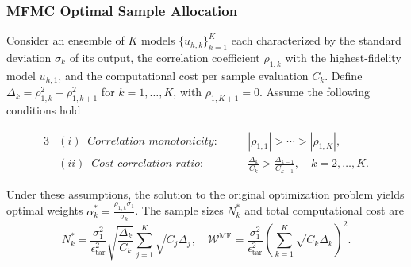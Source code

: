 \documentclass{beamer}
\begin{document}
\begin{frame}[t]
    \frametitle{MFMC Optimal Sample Allocation}
        {\fontsize{8}{8}\selectfont 
        \begin{theorem}
        \label{thm:Sample_size_est}
        Consider an ensemble of $K$ models $\{u_{h,k}\}_{k=1}^K$ each characterized by the standard deviation $\sigma_k$ of its output, the correlation coefficient $\rho_{1,k}$ with the highest-fidelity model $u_{h,1}$, and the computational cost per sample evaluation $C_k$. Define $\Delta_k = \rho_{1,k}^2 - \rho_{1,k+1}^2$ for $k = 1, \dots, K$, with $\rho_{1,K+1} = 0$. Assume the following conditions hold
        \vspace{-5mm}
        
        \begin{alignat*}{3}
        &(i)\;\; \textit{Correlation monotonicity}: \quad && |\rho_{1,1}| > \cdots > |\rho_{1,K}|, \\ 
        &(ii)\;\; \textit{Cost-correlation ratio}: \quad && \frac{\Delta_{k}}{C_k} > \frac{\Delta_{k-1}}{C_{k-1}}, \quad k=2,\ldots,K. 
        \end{alignat*}
        
        \vspace{-3mm}
        Under these assumptions, the solution to the original optimization problem  yields optimal weights $\alpha_k^*=\frac{\rho_{1,k}\sigma_1}{\sigma_k}$.
        The sample sizes $N_k^*$ and total computational cost are
        \vspace{-3mm}
        \[
        N_k^*=\frac{\sigma_1^2}{\epsilon_\text{tar}^2}\sqrt{\frac{\Delta_{k}}{C_k}}\sum_{j=1}^K\sqrt{C_j\Delta_{j}}, \quad \mathcal{W}^\text{MF} = \frac{\sigma_1^2}{\epsilon_{\text{tar}}^2}\left(\sum_{k=1}^K\sqrt{C_k\Delta_{k}}\right)^2.
        \] 
        \end{theorem}
        }

\end{frame}
\end{document}
